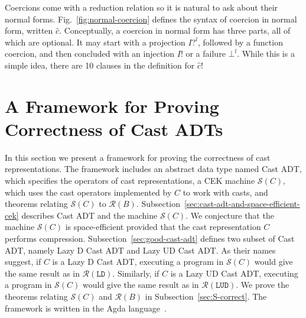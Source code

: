 \documentclass[runningheads]{llncs}
\newcommand{\figref}[1]{Fig.~\ref{#1}}
\newcommand{\RMachine}[1]{\ensuremath{\mathcal{R}(#1)}}
\newcommand{\LDMachine}{\RMachine{\BLD}}
\newcommand{\LUDMachine}{\RMachine{\BLUD}}
\newcommand{\SMachine}[1]{\ensuremath{\mathcal{S}(#1)}}
\newcommand{\BLD}[0]{\ensuremath{\mathtt{LD}}}
\newcommand{\BLUD}[0]{\ensuremath{\mathtt{LUD}}}
\begin{document}
Coercions come with a reduction relation so it is natural to ask about
their normal forms. \figref{fig:normal-coercion} defines the syntax of
coercion in normal form, written $\hat{c}$. Conceptually, a coercion
in normal form has three parts, all of which are optional.  It may
start with a projection $I?^l$, followed by a function coercion, and
then concluded with an injection $I!$ or a failure $\bot^l$. While
this is a simple idea, there are 10 clauses in the definition for
$\hat{c}$!

\section{A Framework for Proving Correctness of Cast ADTs}
\label{sec:framework}

In this section we present a framework for proving the 
correctness of cast representations. The framework includes an abstract data 
type named Cast ADT, which specifies the operators of cast representations, 
a CEK machine $\SMachine{C}$, which uses the cast operators implemented by 
$C$ to work with casts, and theorems relating $\SMachine{C}$ to $\RMachine{B}$.
%
Subsection~\ref{sec:cast-adt-and-space-efficient-cek} describes Cast ADT and the 
machine \SMachine{C}. We conjecture that the machine \SMachine{C} is 
space-efficient provided that the cast representation $C$ performs compression.
%
Subsection~\ref{sec:good-cast-adt} defines two subset of Cast ADT, namely Lazy D 
Cast ADT and Lazy UD Cast ADT. As their names suggest, if $C$ is a Lazy D Cast 
ADT, executing a program in $\SMachine{C}$ would give the same result as in 
$\LDMachine$. Similarly, if $C$ is a Lazy UD Cast ADT, executing a program in 
$\SMachine{C}$ would give the same result as in $\LUDMachine$.
%
We prove the theorems relating \SMachine{C} and \RMachine{B} in
Subsection~\ref{sec:S-correct}.
The framework is written in the Agda language~\citep{norell2008dependently}.
\end{document}
